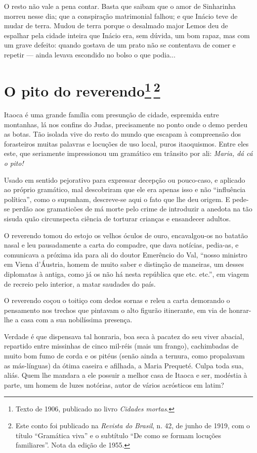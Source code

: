O resto não vale a pena contar. Basta que saibam que o amor de
Sinharinha morreu nesse dia; que a conspiração matrimonial falhou; e que
Inácio teve de mudar de terra. Mudou de terra porque o desalmado major
Lemos deu de espalhar pela cidade inteira que Inácio era, sem dúvida, um
bom rapaz, mas com um grave defeito: quando gostava de um prato não se
contentava de comer e repetir --- ainda levava escondido no bolso o que
podia...

\chapter{O pito do reverendo\footnote[*]{Texto de 1906, publicado no livro \emph{Cidades mortas}.}\,\footnote[**]{Este conto foi publicado
  na \emph{Revista do Brasil}, n. 42, de junho de 1919, com o título
  ``Gramática viva'' e o subtítulo ``De como se formam locuções
  familiares''. Nota da edição de 1955.}}

Itaoca é uma grande família com presunção de cidade, espremida entre
montanhas, lá nos confins do Judas, precisamente no ponto onde o demo
perdeu as botas. Tão isolada vive do resto do mundo que escapam à
compreensão dos forasteiros muitas palavras e locuções de uso local,
puros itaoquismos. Entre eles este, que seriamente impressionou um
gramático em trânsito por ali: \emph{Maria, dá cá o pito!}

Usado em sentido pejorativo para expressar decepção ou pouco-caso, e
aplicado ao próprio gramático, mal descobriram que ele era apenas isso e
não ``influência política'', como o supunham, descreve-se aqui o fato
que lhe deu origem. E pede-se perdão aos gramaticões de má morte pelo
crime de introduzir a anedota na tão sisuda quão circunspecta ciência de
torturar crianças e ensandecer adultos.

O reverendo tomou do estojo os velhos óculos de ouro, encavalgou-os no
batatão nasal e leu pausadamente a carta do compadre, que dava notícias,
pedia-as, e comunicava a próxima ida para ali do doutor Emerêncio do
Val, ``nosso ministro em Viena d'Áustria, homem de muito saber e
distinção de maneiras, um desses diplomatas à antiga, como já os não há
nesta república que etc. etc.'', em viagem de recreio pelo interior, a
matar saudades do país.

O reverendo coçou o toitiço com dedos sornas e releu a carta demorando o
pensamento nos trechos que pintavam o alto figurão itinerante, em via de
honrar-lhe a casa com a sua nobilíssima presença.

Verdade é que dispensava tal honraria, boa seca à pacatez do seu viver
abacial, repartido entre missinhas de cinco mil-réis (mais um frango),
cachimbadas de muito bom fumo de corda e os pitéus (senão ainda a
ternura, como propalavam as más-línguas) da ótima caseira e afilhada, a
Maria Prequeté. Culpa toda sua, aliás. Quem lhe mandara a ele possuir a
melhor casa de Itaoca e ser, modéstia à parte, um homem de luzes
notórias, autor de vários acrósticos em latim?

